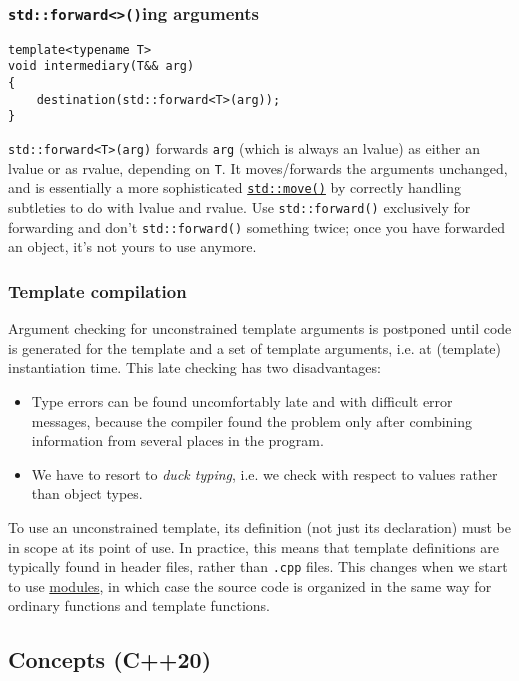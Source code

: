 \documentclass[8pt, table, xcdraw]{article}%
\begin{document}
\subsubsection{\lstinline{std::forward<>()}ing arguments}

\begin{lstlisting}
template<typename T>
void intermediary(T&& arg) 
{
    destination(std::forward<T>(arg));
}
\end{lstlisting}

\lstinline{std::forward<T>(arg)} forwards \lstinline{arg} (which is always an lvalue) as either an lvalue or as rvalue, depending on \lstinline{T}. It moves/forwards the arguments unchanged, and is essentially a more sophisticated \href{}{\lstinline{std::move()}} by correctly handling subtleties to do with lvalue and rvalue. Use \lstinline{std::forward()} exclusively for forwarding and don't \lstinline{std::forward()} something twice; once you have forwarded an object, it's not yours to use anymore.

\subsubsection{Template compilation}

Argument checking for unconstrained template arguments is postponed until code is generated for the template and a set of template arguments, i.e. at (template) instantiation time. This late checking has two disadvantages:

\begin{itemize}
    \item Type errors can be found uncomfortably late and with difficult error messages, because the compiler found the problem only after combining information from several places in the program.
    \item We have to resort to \emph{duck typing}, i.e. we check with respect to values rather than object types.
\end{itemize}

To use an unconstrained template, its definition (not just its declaration) must be in scope at its point of use. In practice, this means that template definitions are typically found in header files, rather than \lstinline{.cpp} files. This changes when we start to use \hyperref[modules]{modules}, in which case the source code is organized in the same way for ordinary functions and template functions.

\subsection{Concepts (C++20)} \label{concepts}
\end{document}
